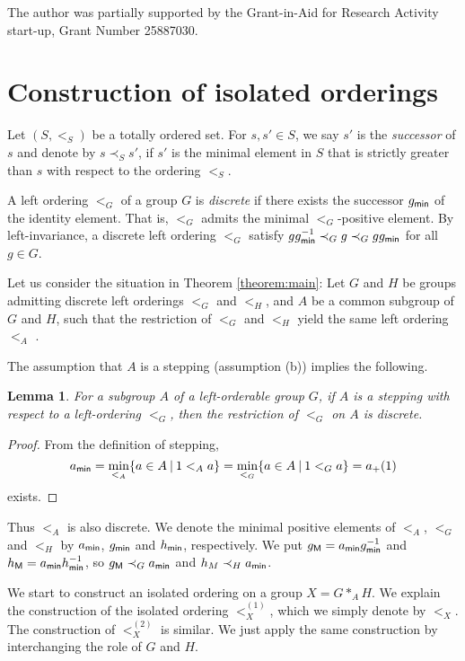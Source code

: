 \documentclass[10pt]{amsart}
\newtheorem{lemma}[theorem]{Lemma}
\numberwithin{equation}{section}
\begin{document}
The author was partially supported by the Grant-in-Aid for Research Activity start-up, Grant Number 25887030.

\section{Construction of isolated orderings}

Let $(S,<_{S})$ be a totally ordered set. For $s,s' \in S$, we say $s'$ is the \emph{successor} of $s$ and denote by $s \prec_{S} s'$, if $s'$ is the minimal element in $S$ that is strictly greater than $s$ with respect to the ordering $<_{S}$.

A left ordering $<_{G}$ of a group $G$ is \emph{discrete} if there exists the successor $g_{\sf min}$ of the identity element. That is, $<_{G}$ admits the minimal $<_{G}$-positive element. By left-invariance, a discrete left ordering $<_{G}$ satisfy 
$g g_{\sf min}^{-1} \prec_{G} g \prec_{G} gg_{\sf min}$ for all $g \in G$. 

Let us consider the situation in Theorem \ref{theorem:main}: Let $G$ and $H$ be groups admitting discrete left orderings $<_{G}$ and $<_{H}$, and $A$ be a common subgroup of $G$ and $H$, such that the restriction of $<_{G}$ and $<_{H}$ yield the same left ordering $<_{A}$ .

The assumption that $A$ is a stepping (assumption (b)) implies the following.
\begin{lemma}
\label{lemma:discA}
For a subgroup $A$ of a left-orderable group $G$, if $A$ is a stepping with respect to a left-ordering $<_{G}$, then the restriction of $<_{G}$ on $A$ is discrete.
\end{lemma}
\begin{proof}
From the definition of stepping, 
\[ a_{\sf min} = \min_{<_{A}} \{a \in A \: | \: 1 <_{A} a\}=\min_{<_{G}} \{a \in A \: | \: 1 <_{G} a\}  = a_{+}(1) \]
exists. 
\end{proof}

Thus $<_{A}$ is also discrete. We denote the minimal positive elements of $<_{A}$, $<_{G}$ and $<_{H}$ by $a_{\sf min}$, $g_{\sf min}$ and $h_{\sf min}$, respectively. We put $g_{\sf M} = a_{\sf min}g_{\sf min}^{-1}$ and $h_{\sf M} = a_{\sf min} h_{\sf min}^{-1}$, so $g_{\sf M} \prec_{G} a_{\sf min}$ and $h_{M} \prec_{H} a_{\sf min}$.

We start to construct an isolated ordering on a group $X=G *_{A} H$. 
We explain the construction of the isolated ordering $<_{X}^{(1)}$, which we simply denote by $<_{X}$. The construction of $<_{X}^{(2)}$ is similar. We just apply the same construction by interchanging the role of $G$ and $H$.
\end{document}
